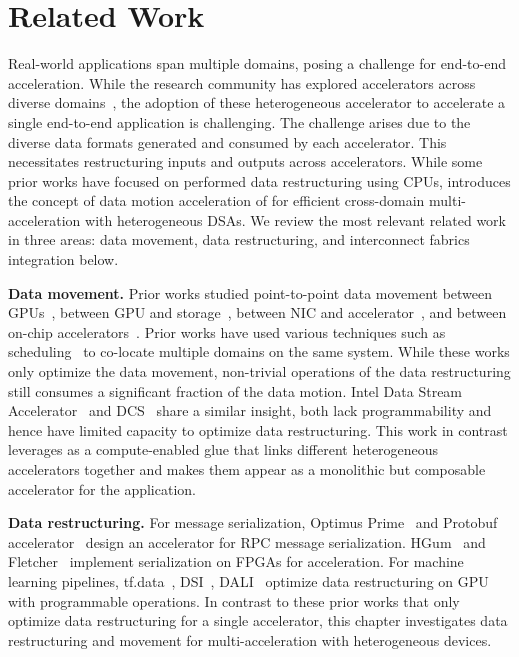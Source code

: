 \section{Related Work}
\label{sec:related}
%
Real-world applications span multiple domains, posing a challenge for end-to-end acceleration.
%
While the research community has explored accelerators across diverse domains~\cite{q100:asplos:2014, meet-the-walkers:isca:2013, doppiodb:fpl:2017,chiosa:pvldb:2022, acc-yolov3:iscas:2020, wfa:fpl:2021, genstore:asplos:2022, segram:isca:2022, meet-the-walker:micro:2013,murray:micro:2016,robox:isca:2018,pointacc:micro:2021,robomorphic:asplos:2021}, the adoption of these heterogeneous accelerator to accelerate a single end-to-end application is challenging.
%
The challenge arises due to the diverse data formats generated and consumed by each accelerator.
%
This necessitates restructuring inputs and outputs across accelerators. 
%
While some prior works have focused on performed data restructuring using CPUs, \dmx introduces the concept of data motion acceleration of for efficient cross-domain multi-acceleration with heterogeneous DSAs.
%
We review the most relevant related work in three areas: data movement, data restructuring, and interconnect fabrics integration below.
%

\noindent \textbf{Data movement.}
%
Prior works studied point-to-point data movement between GPUs~\cite{gpudirect:2019}, between GPU and storage~\cite{morpheus:isca:2016,spin:atc:2017,nds:micro:2021}, between NIC and accelerator~\cite{p2pdma:apsys:2020,lynx:asplos:2020,flexdriver:asplos:2022}, and between on-chip accelerators~\cite{arc:dac:2012}. 
%
Prior works have used various techniques such as scheduling~\cite{wisefuse:sigmetrics:2022, mahapatra:mlarchsys:2022, paragon:asplos:2013, lynx:asplos:2020,flexdriver:asplos:2022} to co-locate multiple domains on the same system. 
%
While these works only optimize the data movement, non-trivial operations of the data restructuring still consumes a significant fraction of the data motion.
%
Intel Data Stream Accelerator~\cite{intel-dsa} and DCS~\cite{dcs:micro:2015, dcs-ctrl:isca:2018} share a similar insight, both lack programmability and hence have limited capacity to optimize data restructuring.
%
This work in contrast leverages \drxs as a compute-enabled glue that links different heterogeneous accelerators together and makes them appear as a monolithic but composable accelerator for the application.
%

\noindent \textbf{Data restructuring.}
%
For message serialization, Optimus Prime~\cite{optimusprime:asplos:2020} and Protobuf accelerator~\cite{protobuf:isca:2021} design an accelerator for RPC message serialization.
%
HGum~\cite{hgum:reconfig:2017} and Fletcher~\cite{peltenburg-2019-fletcher} implement serialization on FPGAs for acceleration.
%
For machine learning pipelines, tf.data~\cite{tf.data:pvldb:2021}, DSI~\cite{dsi-dlrm:isca:2022}, DALI~\cite{nvidia-dali:2018} optimize data restructuring on GPU with programmable operations.
%
In contrast to these prior works that only optimize data restructuring for a single accelerator, this chapter investigates data restructuring and movement for multi-acceleration with heterogeneous devices.
%

